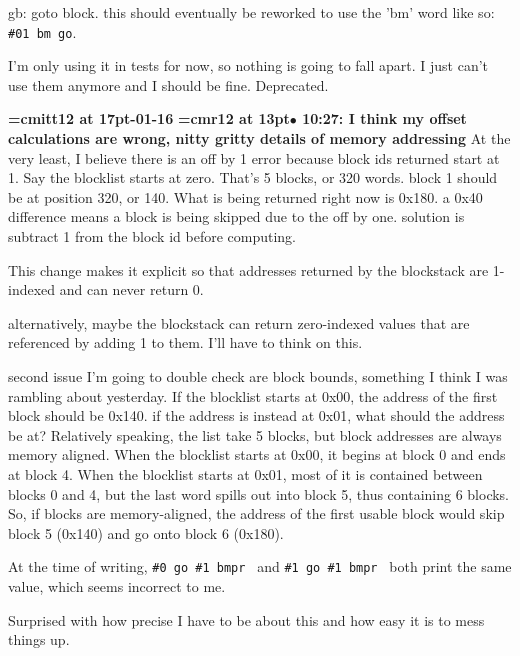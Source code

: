 gb: goto block. this should eventually be reworked to use the 'bm' word like so: {\tt \#01 bm go}.
\par

I'm only using it in tests for now, so nothing is going to fall apart. I just can't use them anymore and I should be fine. Deprecated.
\par

{\medskip\noindent\bf\font\titlefont=cmitt12 at 17pt-01-16}\medskip
{\smallskip\noindent\bf\font\titlefont=cmr12 at 13pt\titlefont $\bullet$ 10:27: I think my offset calculations are wrong, nitty gritty details of memory addressing}\smallskip
At the very least, I believe there is an off by 1 error because block ids returned start at 1. Say the blocklist starts at zero. That's 5 blocks, or 320 words. block 1 should be at position 320, or 140. What is being returned right now is 0x180. a 0x40 difference means a block is being skipped due to the off by one. solution is subtract 1 from the block id before computing.
\par

This change makes it explicit so that addresses returned by the blockstack are 1-indexed and can never return 0.
\par

alternatively, maybe the blockstack can return zero-indexed values that are referenced by adding 1 to them. I'll have to think on this.
\par

second issue I'm going to double check are block bounds, something I think I was rambling about yesterday. If the blocklist starts at 0x00, the address of the first block should be 0x140. if the address is instead at 0x01, what should the address be at? Relatively speaking, the list take 5 blocks, but block addresses are always memory aligned. When the blocklist starts at 0x00, it begins at block 0 and ends at block 4. When the blocklist starts at 0x01, most of it is contained between blocks 0 and 4, but the last word spills out into block 5, thus containing 6 blocks. So, if blocks are memory-aligned, the address of the first usable block would skip block 5 (0x140) and go onto block 6 (0x180).
\par

At the time of writing, {\tt \#0 go \#1 bmpr } and {\tt \#1 go \#1 bmpr } both print the same value, which seems incorrect to me.
\par

Surprised with how precise I have to be about this and how easy it is to mess things up.
\par

